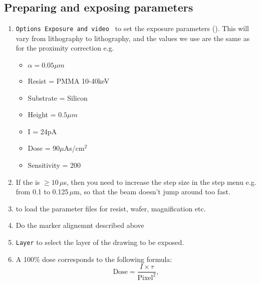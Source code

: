 \subsection{Preparing and exposing parameters}
 \begin{enumerate}
 \item    \texttt{Options    \ira     Exposure    and    video    \ira
     }  to set  the exposure  parameters (). This
   will vary  from lithography to  lithography, and the values  we use
   are the same as for the proximity correction e.g.
   \begin{itemize}
   \item $\alpha=0.05\mu m$
   \item Resist = PMMA 10-40keV
   \item Substrate = Silicon
   \item Height = $0.5\mu m$
   \item I = 24pA
   \item Dose = 90$ \mu $As/cm$ ^{2} $
   \item Sensitivity = 200
   \end{itemize}
 \item If  the  is $  \ge 10\, \mu$s,  then you
   need to increase  the step size in  the step menu e.g.  from 0.1 to
   0.125$ \,\mu $m, so that the beam doesn't jump around too fast.
 \item {}  to load the
   parameter  files for  resist, wafer,  magnification etc.  
 \item Do the marker alignemnt described above
 \item  \texttt{Layer}  to select  the  layer  of  the drawing  to  be
   exposed.
 \item A 100\% dose corresponds to the following formula:
   \begin{equation}
     \text{Dose} = \frac{I\times \tau}{\text{Pixel}^{2}},
   \end{equation}

\end{enumerate}
